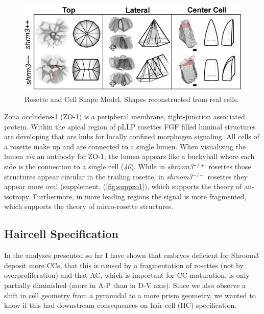 \documentclass[11pt,singlespacinge,twoside]{reedthesis} %
\theoremstyle{definition}
\theoremstyle{definition}
\theoremstyle{definition}
\theoremstyle{remark}
\begin{document}
\begin{figure}

{\centering \includegraphics[width=0.9\linewidth]{figures/summary/cell-model} 

}

\caption[Rosette and Cell Shape Model]{Rosette and Cell Shape Model. Shapes reconstructed from real cells.}\label{fig:sumcells}
\end{figure}
Zona occludens-1 (ZO-1) is a peripheral membrane, tight-junction associated protein. Within the apical region of pLLP rosettes FGF filled luminal structures are developing that are hubs for locally confined morphogen signaling. All cells of a rosette make up and are connected to a single lumen. When visualizing the lumen \emph{via} an antibody for ZO-1, the lumen appears like a buckyball where each side is the connection to a single cell (\emph{40}). While in \emph{shroom3}\(^{+/+}\) rosettes those structures appear circular in the trailing rosette, in \emph{shroom3}\(^{-/-}\) rosettes they appear more oval (supplement, (\ref{fig:suppzo1}), which supports the theory of an-isotropy. Furthermore, in more leading regions the signal is more fragmented, which supports the theory of micro-rosette structures.

\hypertarget{res-hc}{%
\subsection{Haircell Specification}\label{res-hc}}

In the analyses presented so far I have shown that embryos deficient for Shroom3 deposit more CCs, that this is caused by a fragmentation of rosettes (not by overproliferation) and that AC, which is important for CC maturation, is only partially diminished (more in A-P than in D-V axis). Since we also observe a shift in cell geometry from a pyramidal to a more prism geometry, we wanted to know if this had downstream consequences on hair-cell (HC) specification.
\end{document}

